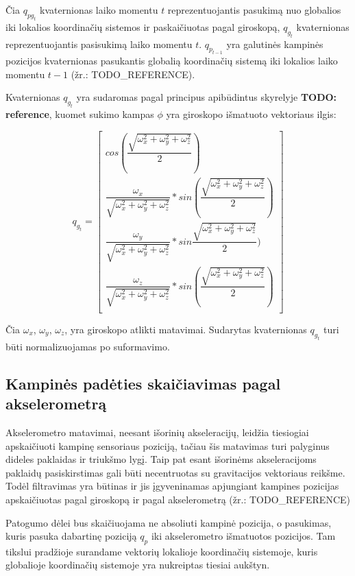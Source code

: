 \documentclass[12pt, a4paper, lithuanian, final]{article}
\begin{document}
Čia $q_{pg_{t}}$ kvaternionas laiko momentu $t$ reprezentuojantis pasukimą nuo globalios iki lokalios koordinačių sistemos ir paskaičiuotas pagal giroskopą, $q_{g_{t}}$ kvaternionas reprezentuojantis pasisukimą laiko momentu $t$.
$q_{p_{t-1}}$ yra galutinės kampinės pozicijos kvaternionas pasukantis globalią koordinačių sistemą iki lokalios laiko momentu $t-1$ (žr.: TODO\_REFERENCE).

Kvaternionas $q_{g_{t}}$ yra sudaromas pagal principus apibūdintus skyrelyje \textbf{TODO: reference}, kuomet sukimo kampas $\phi$ yra giroskopo išmatuoto vektoriaus ilgis:

\begin{equation}
	q_{g_{t}} = \left[
		\begin{array}{c}
			cos(\dfrac{\sqrt{\omega_x^2 + \omega_y^2 + \omega_z^2}}{2}) \\
			\dfrac{\omega_x}{\sqrt{\omega_x^2 + \omega_y^2 + \omega_z^2}} * sin(\dfrac{\sqrt{\omega_x^2 + \omega_y^2 + \omega_z^2}}{2}) \\
			\dfrac{\omega_y}{\sqrt{\omega_x^2 + \omega_y^2 + \omega_z^2}} * sin\dfrac{\sqrt{\omega_x^2 + \omega_y^2 + \omega_z^2}}{2}) \\
			\dfrac{\omega_z}{\sqrt{\omega_x^2 + \omega_y^2 + \omega_z^2}} * sin(\dfrac{\sqrt{\omega_x^2 + \omega_y^2 + \omega_z^2}}{2}) \\
		\end{array}
	\right]
\end{equation}

Čia $\omega_x$, $\omega_y$, $\omega_z$, yra giroskopo atlikti matavimai.
Sudarytas kvaternionas $q_{g_t}$ turi būti normalizuojamas po suformavimo.


\subsection{Kampinės padėties skaičiavimas pagal akselerometrą}

Akselerometro matavimai, neesant išorinių akseleracijų, leidžia tiesiogiai apskaičiuoti kampinę sensoriaus poziciją, tačiau šis matavimas turi palyginus dideles paklaidas ir triukšmo lygį.
Taip pat esant išorinėms akseleracijoms paklaidų pasiskirstimas gali būti necentruotas su gravitacijos vektoriaus reikšme.
Todėl filtravimas yra būtinas ir jis įgyveninamas apjungiant kampines pozicijas apskaičiuotas pagal giroskopą ir pagal akselerometrą (žr.: TODO\_REFERENCE)

Patogumo dėlei bus skaičiuojama ne absoliuti kampinė pozicija, o pasukimas, kuris pasuka dabartinę poziciją $q_p$ iki akselerometro išmatuotos pozicijos.
Tam tikslui pradžioje surandame vektorių lokalioje koordinačių sistemoje, kuris globalioje koordinačių sistemoje yra nukreiptas tiesiai aukštyn.
\end{document}
